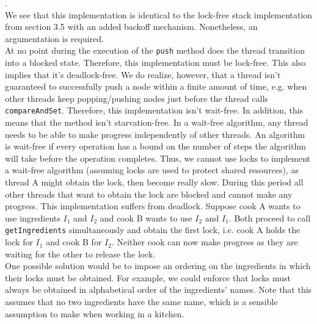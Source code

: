 \documentclass[main]{subfiles}
\begin{document}
\begin{ExerciseList}
        \Answer[ref={PC}].\quad \\
            \Question We see that this implementation is identical to the lock-free stack implementation from section 3.5 with an added backoff mechanism. Nonetheless, an argumentation is required. \\[3mm]
            At no point during the execution of the \texttt{push} method does the thread transition into a blocked state. Therefore, this implementation must be lock-free. This also implies that it's deadlock-free. We do realize, however, that a thread isn't guaranteed to successfully push a node within a finite amount of time, e.g. when other threads keep popping/pushing nodes just before the thread calls \texttt{compareAndSet}. Therefore, this implementation isn't wait-free. In addition, this means that the method isn't starvation-free.
            \Question In a wait-free algorithm, any thread needs to be able to make progress independently of other threads. An algorithm is wait-free if every operation has a bound on the number of steps the algorithm will take before the operation completes. Thus, we cannot use locks to implement a wait-free algorithm (assuming locks are used to protect shared resources), as thread A might obtain the lock, then become really slow. During this period all other threads that want to obtain the lock are blocked and cannot make any progress.
            \Question This implementation suffers from deadlock. Suppose cook A wants to use ingredients $I_1$ and $I_2$ and cook B wants to use $I_2$ and $I_1$. Both proceed to call \texttt{getIngredients} simultaneously and obtain the first lock, i.e. cook A holds the lock for $I_1$ and cook B for $I_2$. Neither cook can now make progress as they are waiting for the other to release the lock.\\[3mm]
            One possible solution would be to impose an ordering on the ingredients in which their locks must be obtained. For example, we could enforce that locks must always be obtained in alphabetical order of the ingredients' names. Note that this assumes that no two ingredients have the same name, which is a sensible assumption to make when working in a kitchen.
        \pagebreak
            

\end{ExerciseList}
\end{document}
